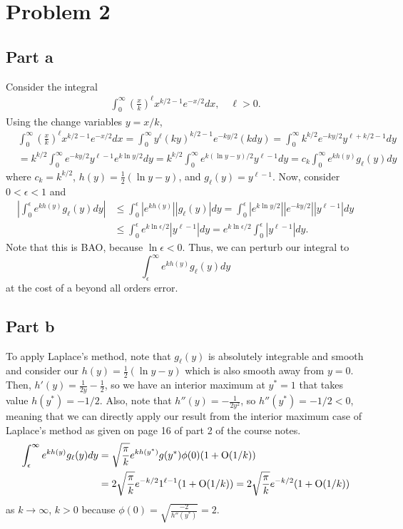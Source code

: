\documentclass{article}
\begin{document}
\section{Problem 2}
\subsection{Part a}
Consider the integral
    \begin{align*}
      \int_0^\infty \left(\frac{x}{k}\right)^\ell x^{k/2-1} e^{-x/2} d x, \quad \ell > 0.
    \end{align*}
Using the change variables $y = x/k$, 
\begin{align*}
&\int_0^\infty \left(\frac{x}{k}\right)^\ell x^{k/2-1} e^{-x/2} d x=\int_0^\infty y^\ell (ky)^{k/2-1}e^{-ky/2}(kdy)=\int_0^\infty k^{k/2}e^{-ky/2}y^{\ell+k/2-1}dy\\&=
k^{k/2}\int_0^\infty e^{-ky/2}y^{\ell-1}e^{k\ln{y}/2}dy=k^{k/2}\int_0^\infty e^{k(\ln{y}-y)/2}y^{\ell-1}dy=c_k\int_0^\infty e^{k h(y)} g_\ell(y) d y
\end{align*}
where $c_k=k^{k/2}$, $h(y)=\frac{1}{2}(\ln{y}-y)$, and $g_\ell(y)=y^{\ell-1}$. Now, consider $0<\epsilon<1$ and 
\begin{align*}
\left|\int_0^\epsilon e^{k h(y)} g_\ell(y) d y\right|&\leq\int_0^\epsilon |e^{k h(y)}| |g_\ell(y)| d y=\int_0^\epsilon |e^{k\ln{y}/2}||e^{-ky/2}||y^{\ell-1}|dy\\&\leq
\int_0^\epsilon e^{k\ln{\epsilon}/2}|y^{\ell-1}|dy=e^{k\ln{\epsilon}/2}\int_0^\epsilon|y^{\ell-1}|dy.
\end{align*}
Note that this is BAO, because $\ln{\epsilon}<0$. Thus, we can perturb our integral to 
\[
\int_\epsilon^\infty e^{k h(y)} g_\ell(y) d y
\]
at the cost of a beyond all orders error.

\subsection{Part b}
To apply Laplace's method, note that $g_\ell(y)$ is absolutely integrable and smooth and consider our $h(y)=\frac{1}{2}(\ln{y}-y)$ which is also smooth away from $y=0$. Then, $h'(y)=\frac{1}{2y}-\frac{1}{2}$, so we have an interior maximum at $y^*=1$ that takes value $h(y^*)=-1/2$. Also, note that $h''(y)=-\frac{1}{2y^2}$, so $h''(y^*)=-1/2<0$, meaning that we can directly apply our result from the interior maximum case of Laplace's method as given on page 16 of part 2 of the course notes. 
\begin{align*}
\int_\epsilon^\infty e^{k h(y)} g_\ell(y) d y&=\sqrt{\frac{\pi}{k}}e^{kh(y^*)}g(y^*){\phi(0)}(1+\operatorname{O}(1/k))\\&=
2\sqrt{\frac{\pi}{k}}e^{-k/2}1^{\ell-1}(1+\operatorname{O}(1/k))=2\sqrt{\frac{\pi}{k}}e^{-k/2}(1+\operatorname{O}(1/k))
\end{align*}
as $k\to\infty$, $k>0$ because $\phi(0)=\sqrt{\frac{-2}{h''(y^*)}}=2$.
\end{document}
